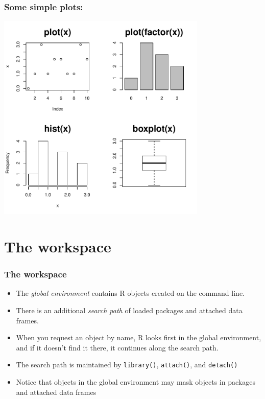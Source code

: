 \documentclass{beamer}
\newcommand{\code}[1]{\texttt{#1}}
\begin{document}
\begin{frame}[fragile]
\frametitle{Some simple plots:}
\includegraphics[width=0.75\textwidth]{spe_intro_plots}
\end{frame}



\section{The workspace}

\begin{frame}{}
  \frametitle{The workspace}
  \begin{itemize}
  \item The \emph{global environment} contains R objects created on the
    command line. 
  \item There is an additional \emph{search path} of loaded packages
    and attached data frames.
  \item When you request an object by name, R looks first in the
    global environment, and if it doesn't find it there, it continues
    along the search path.
  \item The search path is maintained by \code{library()},
    \code{attach()}, and \code{detach()}
  \item Notice that objects in the global environment may mask objects
    in packages and attached data frames
  \end{itemize}
\end{frame}
\end{document}
